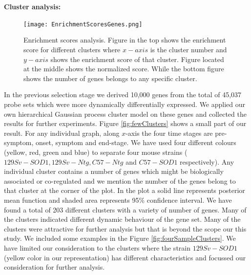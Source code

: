 \paragraph{Cluster analysis:} 
\begin{figure}
 \begin{center}
 \texttt{[image: EnrichmentScoresGenes.png]}
  \caption [Enrichment scores analysis for different clusters] 
  {Enrichment scores analysis. Figure in the top shows the enrichment score   for different clusters where $x-axis$ is the cluster number and $y-axis$ shows the   enrichment score of that cluster. Figure located at the middle shows the normalized score. While the bottom figure shows the number of genes belongs to any specific cluster.
  \label{fig:EnrichmentScores}}
 \end{center}
\end{figure}
In the previous selection stage we derived 10,000 genes from the total of 45,037 probe sets which were more dynamically differentially expressed. We applied our own hierarchical Gaussian process cluster model on these genes and collected the results for further experiments. Figure \ref{fig:fewClusters} shows a small part of our result. For any individual graph, along $x$-axis the four time stages are pre-symptom, onset, symptom and end-stage. We have used four different colours (yellow, red, green and blue) to separate four mouse strains ($129Sv-SOD1, 129Sv-Ntg, C57-Ntg$ and $C57-SOD1$ respectively). Any individual cluster contains a number of genes which might be biologically associated or co-regulated and we mention the number of the genes belong to that cluster at the corner of the plot. In the plot a solid line represents posterior mean function and shaded area represents 95\% confidence interval. We have found a total of 203 different clusters with a variety of number of genes. Many of the clusters indicated different dynamic behaviour of the gene set. Many of the clusters were attractive for further analysis but that is beyond the scope our this study. We included some examples in the Figure \ref{fig:fourSampleClusters}. We have limited our consideration to the clusters where the strain $129Sv-SOD1$ (yellow color in our representation) has different characteristics and focussed our consideration for further analysis.

